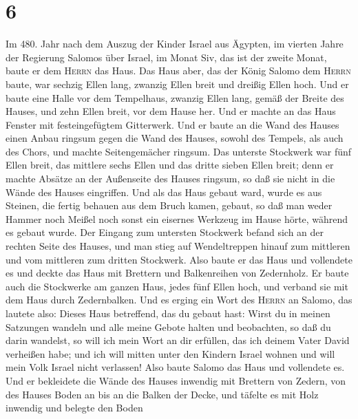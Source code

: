 \hypertarget{section-5}{%
\section{6}\label{section-5}}

 Im 480. Jahr nach dem Auszug der Kinder Israel aus
Ägypten, im vierten Jahre der Regierung Salomos über Israel, im Monat
Siv, das ist der zweite Monat, baute er dem \textsc{Herrn} das Haus.
 Das Haus aber, das der König Salomo dem \textsc{Herrn}
baute, war sechzig Ellen lang, zwanzig Ellen breit und dreißig Ellen
hoch.  Und er baute eine Halle vor dem Tempelhaus, zwanzig
Ellen lang, gemäß der Breite des Hauses, und zehn Ellen breit, vor dem
Hause her.  Und er machte an das Haus Fenster mit
festeingefügtem Gitterwerk.  Und er baute an die Wand des
Hauses einen Anbau ringsum gegen die Wand des Hauses, sowohl des
Tempels, als auch des Chors, und machte Seitengemächer ringsum.
 Das unterste Stockwerk war fünf Ellen breit, das mittlere
sechs Ellen und das dritte sieben Ellen breit; denn er machte Absätze an
der Außenseite des Hauses ringsum, so daß sie nicht in die Wände des
Hauses eingriffen.  Und als das Haus gebaut ward, wurde es
aus Steinen, die fertig behauen aus dem Bruch kamen, gebaut, so daß man
weder Hammer noch Meißel noch sonst ein eisernes Werkzeug im Hause
hörte, während es gebaut wurde.  Der Eingang zum untersten
Stockwerk befand sich an der rechten Seite des Hauses, und man stieg auf
Wendeltreppen hinauf zum mittleren und vom mittleren zum dritten
Stockwerk.  Also baute er das Haus und vollendete es und
deckte das Haus mit Brettern und Balkenreihen von Zedernholz.
 Er baute auch die Stockwerke am ganzen Haus, jedes fünf
Ellen hoch, und verband sie mit dem Haus durch Zedernbalken.
 Und es erging ein Wort des \textsc{Herrn} an Salomo, das
lautete also:  Dieses Haus betreffend, das du gebaut
hast: Wirst du in meinen Satzungen wandeln und alle meine Gebote halten
und beobachten, so daß du darin wandelst, so will ich mein Wort an dir
erfüllen, das ich deinem Vater David verheißen habe;  und
ich will mitten unter den Kindern Israel wohnen und will mein Volk
Israel nicht verlassen!  Also baute Salomo das Haus und
vollendete es.  Und er bekleidete die Wände des Hauses
inwendig mit Brettern von Zedern, von des Hauses Boden an bis an die
Balken der Decke, und täfelte es mit Holz inwendig und belegte den Boden
